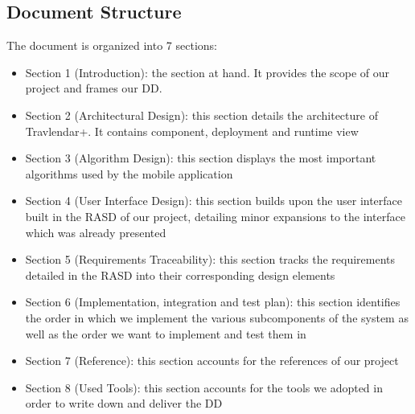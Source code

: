 \subsection{Document Structure}
The document is organized into 7 sections:

\begin{itemize}
	\item Section 1  (Introduction): the section at hand. It provides the scope of our project and frames our DD.
	\item Section 2 (Architectural Design): this section details the architecture of Travlendar+. It contains component, deployment and runtime view
	\item Section 3 (Algorithm Design): this section displays the most important algorithms used by the mobile application
	\item Section 4 (User Interface Design): this section  builds upon the user interface built in the RASD of our project, detailing minor expansions to the interface which was already presented
	\item Section 5 (Requirements Traceability): this section tracks the requirements detailed in the RASD into their corresponding design elements
	\item Section 6 (Implementation, integration and test plan): this section identifies the order in which we implement the various subcomponents of the system as well as the order we want to implement and test them in
	\item Section  7 (Reference): this section accounts for the references of our project
	\item Section 8 (Used Tools): this section accounts for the tools we adopted in order to write down and deliver the DD
\end{itemize}
